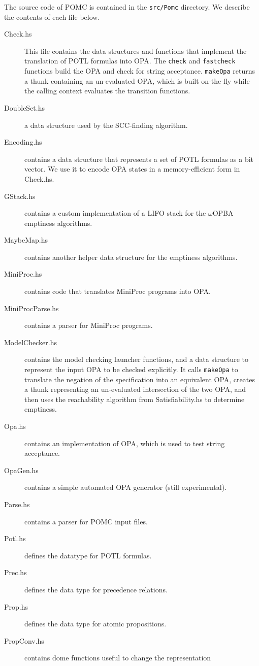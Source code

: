 \documentclass[9pt,a4paper]{article}
\begin{document}
The source code of POMC is contained in the \texttt{src/Pomc} directory.
We describe the contents of each file below.
\begin{description}
\item[Check.hs] This file contains the data structures and functions
  that implement the translation of POTL formulas into OPA.
  The \texttt{check} and \texttt{fastcheck} functions build the OPA
  and check for string acceptance. \texttt{makeOpa} returns
  a thunk containing an un-evaluated OPA, which is built on-the-fly
  while the calling context evaluates the transition functions.
\item[DoubleSet.hs] a data structure used by the SCC-finding algorithm.
\item[Encoding.hs] contains a data structure that represents a set of POTL
  formulas as a bit vector. We use it to encode OPA states in a
  memory-efficient form in Check.hs.
\item[GStack.hs] contains a custom implementation of a LIFO stack
  for the $\omega$OPBA emptiness algorithms.
\item[MaybeMap.hs] contains another helper data structure for the emptiness algorithms.
\item[MiniProc.hs] contains code that translates MiniProc programs into OPA.
\item[MiniProcParse.hs] contains a parser for MiniProc programs.
\item[ModelChecker.hs] contains the model checking launcher functions,
  and a data structure to represent the input OPA to be checked explicitly.
  It calls \texttt{makeOpa} to translate the negation of the specification
  into an equivalent OPA, creates a thunk representing an un-evaluated
  intersection of the two OPA, and then uses the reachability algorithm from
  Satisfiability.hs to determine emptiness.
\item[Opa.hs] contains an implementation of OPA, which is used to test
  string acceptance.
\item[OpaGen.hs] contains a simple automated OPA generator (still experimental).
\item[Parse.hs] contains a parser for POMC input files.
\item[Potl.hs] defines the datatype for POTL formulas.
\item[Prec.hs] defines the data type for precedence relations.
\item[Prop.hs] defines the data type for atomic propositions.
\item[PropConv.hs] contains dome functions useful to change the representation

\end{description}
\end{document}
